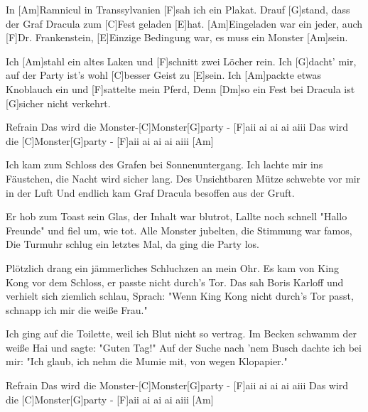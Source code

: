 

\begin{guitar}
	In [Am]Ramnicul in Transsylvanien [F]sah ich ein Plakat.
	Drauf [G]stand, dass der Graf Dracula zum [C]Fest geladen [E]hat.
	[Am]Eingeladen war ein jeder, auch [F]Dr. Frankenstein,
	[E]Einzige Bedingung war, es muss ein Monster [Am]sein.
	
	Ich [Am]stahl ein altes Laken und [F]schnitt zwei Löcher rein.
	Ich [G]dacht' mir, auf der Party ist's wohl [C]besser Geist zu [E]sein.
	Ich [Am]packte etwas Knoblauch ein und [F]sattelte mein Pferd,
	Denn [Dm]so ein Fest bei Dracula ist [G]sicher nicht verkehrt.
	
  \begin{chorus}{Refrain}
	Das wird die Monster-[C]Monster[G]party - [F]aii ai ai ai aiii
	Das wird die [C]Monster[G]party - [F]aii ai ai ai aiii [Am]{}%
  \end{chorus}
	
	Ich kam zum Schloss des Grafen bei Sonnenuntergang.
	Ich lachte mir ins Fäustchen, die Nacht wird sicher lang.
	Des Unsichtbaren Mütze schwebte vor mir in der Luft
	Und endlich kam Graf Dracula besoffen aus der Gruft.
	
	Er hob zum Toast sein Glas, der Inhalt war blutrot,
	Lallte noch schnell "Hallo Freunde" und fiel um, wie tot.
	Alle Monster jubelten, die Stimmung war famos,
	Die Turmuhr schlug ein letztes Mal, da ging die Party los.
	
	 
	
	Plötzlich drang ein jämmerliches Schluchzen an mein Ohr.
	Es kam von King Kong vor dem Schloss, er passte nicht durch's Tor.
	Das sah Boris Karloff und verhielt sich ziemlich schlau,
	Sprach: "Wenn King Kong nicht durch's Tor passt, schnapp ich mir die weiße Frau."
	
	\pagebreak
	
	Ich ging auf die Toilette, weil ich Blut nicht so vertrag.
	Im Becken schwamm der weiße Hai und sagte: "Guten Tag!"
	Auf der Suche nach 'nem Busch dachte ich bei mir:
	"Ich glaub, ich nehm die Mumie mit, von wegen Klopapier."
	
  \begin{chorus}{Refrain}
	Das wird die Monster-[C]Monster[G]party - [F]aii ai ai ai aiii
	Das wird die [C]Monster[G]party - [F]aii ai ai ai aiii [Am]{}%
  \end{chorus}
	

\end{guitar}
